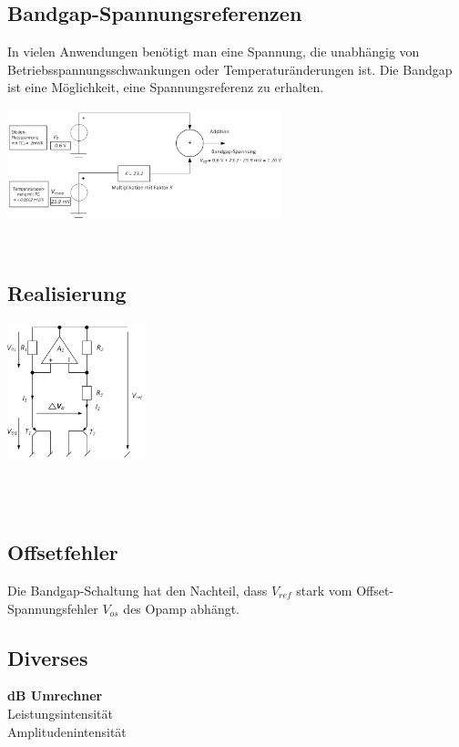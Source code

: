 \subsection{Bandgap-Spannungsreferenzen}
In vielen Anwendungen benötigt man eine Spannung, die unabhängig von Betriebsspannungsschwankungen oder Temperaturänderungen ist. Die Bandgap ist eine Möglichkeit, eine Spannungsreferenz zu erhalten.\\
\begin{minipage}{0.5\linewidth}
\includegraphics[width=8cm]{Bandgap Spannungsreferenz.png}
\end{minipage}%
\begin{minipage}{0.5\linewidth}
\\
\end{minipage}
\subsection{Realisierung}
\begin{minipage}{0.3\linewidth}
\includegraphics[width=4cm]{Bandgap Schaltung.png}
\end{minipage}%
\begin{minipage}{0.7\linewidth}
\\
\\
\end{minipage}
\subsection{Offsetfehler}
Die Bandgap-Schaltung hat den Nachteil, dass $V_{ref}$ stark vom Offset-Spannungsfehler $V_{os}$ des Opamp abhängt.\\
\subsection{Diverses}
\textbf{dB Umrechner}\\
\hspace{5pt} Leistungsintensität\\
\hspace{5pt} Amplitudenintensität\\